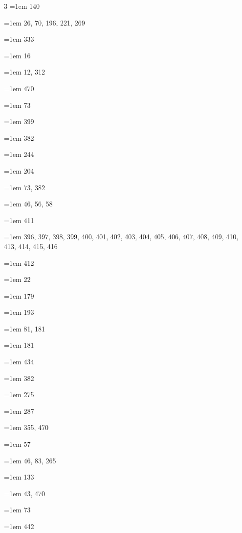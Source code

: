 \begin{multicols}{3}
\hangindent=1em  140\par
\hangindent=1em  26, 70, 196, 221, 269\par
\hangindent=1em  333\par
\hangindent=1em  16\par
\hangindent=1em  12, 312\par
\hangindent=1em  470\par
\hangindent=1em  73\par
\hangindent=1em  399\par
\hangindent=1em  382\par
\hangindent=1em  244\par
\hangindent=1em  204\par
\hangindent=1em  73, 382\par
\hangindent=1em  46, 56, 58\par
\hangindent=1em  411\par
\hangindent=1em  396, 397, 398, 399, 400, 401, 402, 403, 404, 405, 406, 407, 408, 409, 410, 413, 414, 415, 416\par
\hangindent=1em  412\par
\hangindent=1em  22\par
\hangindent=1em  179\par
\hangindent=1em  193\par
\hangindent=1em  81, 181\par
\hangindent=1em  181\par
\hangindent=1em  434\par
\hangindent=1em  382\par
\hangindent=1em  275\par
\hangindent=1em  287\par
\hangindent=1em  355, 470\par
\hangindent=1em  57\par
\hangindent=1em  46, 83, 265\par
\hangindent=1em  133\par
\hangindent=1em  43, 470\par
\hangindent=1em  73\par
\hangindent=1em  442\par

\end{multicols}
